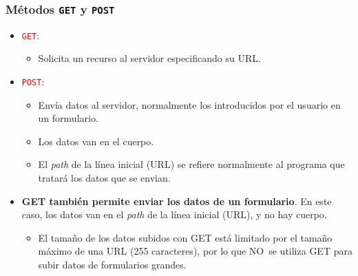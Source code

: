 \documentclass[hyperref={pdfpagelabels=true},ucs]{beamer}
\begin{document}


\begin{frame}[fragile]
\frametitle{Métodos \texttt{GET} y \texttt{POST}}

\begin{itemize}
\item \textcolor{red}{\Verb|GET|}:
  \begin{itemize}
  \item Solicita un recurso al servidor especificando su URL.
  \end{itemize}


\item \textcolor{red}{\Verb|POST|}:
  \begin{itemize}
  \item Envía datos al servidor, normalmente los introducidos por el
    usuario en un formulario.
  \item Los datos van en el cuerpo.
  \item El \emph{path} de la línea inicial (URL) se refiere normalmente al programa
    que tratará los datos que se envian.
  \end{itemize}
  
\item \textbf{GET también permite enviar los datos de un
    formulario}. En este caso, los datos van en el \emph{path} de la
  línea inicial (URL), y no hay cuerpo. 
 
  \begin{itemize}
  \item El tamaño de los datos subidos con GET está limitado por el
    tamaño máximo de una URL (255 caracteres), por lo que NO~se
    utiliza GET para subir datos de formularios grandes.
  \end{itemize}

\end{itemize}

\end{frame}
\end{document}
